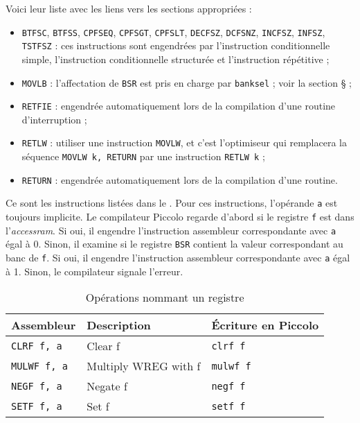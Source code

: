Voici leur liste avec les liens vers les sections appropriées :\begin{itemize}
  \item \texttt{BTFSC}, \texttt{BTFSS}, \texttt{CPFSEQ}, \texttt{CPFSGT}, \texttt{CPFSLT}, \texttt{DECFSZ}, \texttt{DCFSNZ}, \texttt{INCFSZ}, \texttt{INFSZ}, \texttt{TSTFSZ} : ces instructions sont engendrées par l’instruction conditionnelle simple, l’instruction conditionnelle structurée et l’instruction répétitive ;
  \item \texttt{MOVLB} : l’affectation de \texttt{BSR} est pris en charge par \texttt{banksel} ; voir la section § ;
  \item \texttt{RETFIE} : engendrée automatiquement lors de la compilation d’une routine d’interruption ;
  \item \texttt{RETLW} : utiliser une instruction \texttt{MOVLW}, et c’est l’optimiseur qui remplacera la séquence \texttt{MOVLW k, RETURN} par une instruction \texttt{RETLW k} ;
  \item \texttt{RETURN} : engendrée automatiquement lors de la compilation d’une routine.

\end{itemize}








Ce sont les instructions listées dans le . Pour ces instructions, l'opérande \texttt{a} est toujours implicite. Le compilateur Piccolo regarde d'abord si le registre \texttt{f} est dans l'\emph{accessram}. Si oui, il engendre l'instruction assembleur correspondante avec \texttt{a} égal à 0. Sinon, il examine si le registre \texttt{BSR} contient la valeur correspondant au banc de \texttt{f}. Si oui, il engendre l'instruction assembleur correspondante avec \texttt{a} égal à 1. Sinon, le compilateur signale l'erreur.



\begin{table}[!ht]
  \centering
  \small
  \begin{tabular}{lll}
    \textbf{Assembleur} & \textbf{Description} & \textbf{Écriture en Piccolo}\\
    \hline
    \texttt{CLRF f, a} & Clear f & \texttt{clrf f} \\
    \texttt{MULWF f, a} & Multiply WREG with f & \texttt{mulwf f} \\
    \texttt{NEGF f, a} & Negate f & \texttt{negf f} \\
    \texttt{SETF f, a} & Set f & \texttt{setf f}\\
  \hline
  \end{tabular}
  \caption{Opérations nommant un registre}
\end{table}








